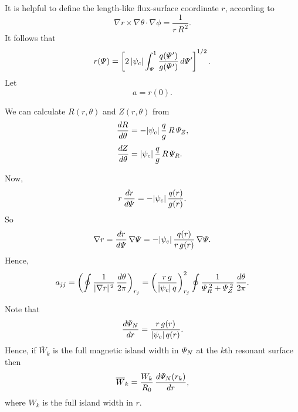 \documentclass[12pt]{article}
\begin{document}
It is helpful to define the length-like flux-surface coordinate $r$, according to
\begin{equation}
\nabla r\times \nabla\theta\cdot\nabla \phi = \frac{1}{r\,R^{\,2}}.
\end{equation}
It follows that
\begin{equation}
r({\mit\Psi}) = \left[2\,|\psi_c|\int_{{\mit\Psi}}^1\frac{q({\mit\Psi}')}
{g({\mit\Psi}')}\,d{\mit\Psi}'\right]^{1/2}.
\end{equation}
Let
\begin{equation}
a = r (0).
\end{equation}

We can calculate $R(r,\theta)$ and $Z(r,\theta)$ from 
\begin{align}
\frac{dR}{d\theta}&=-|\psi_c|\,\frac{q}{g}\,R\,{\mit\Psi}_Z,\\[0.5ex]
\frac{dZ}{d\theta} &= |\psi_c|\,\frac{q}{g}\,R\,{\mit\Psi}_R.
\end{align}

Now,
\begin{equation}
r\,\frac{dr}{d{\mit\Psi}} = -|\psi_c|\,\frac{q(r)}{g(r)}.
\end{equation}
So
\begin{equation}
\nabla r = \frac{dr}{d{\mit\Psi}}\,\nabla{\mit\Psi} = -|\psi_c|\,\frac{q(r)}{r\,g(r)}\,\nabla{\mit\Psi}.
\end{equation}
Hence,
\begin{equation}
a_{jj}  =\left(\oint \frac{1}{|\nabla r|^{\,2}}\,\frac{d\theta}{2\pi}\right)_{r_j} = \left(\frac{r\,g}{|\psi_c|\,q}\right)^2_{r_j}\oint
\frac{1}{{\mit\Psi}_R^{\,2}+{\mit\Psi}_Z^{\,2}}\,\frac{d\theta}{2\pi}.
\end{equation}

Note that
\begin{equation}
\frac{d{\mit\Psi}_N}{dr} =\frac{r\,g(r)}{|\psi_c|\,q(r)}.
\end{equation}
Hence, if $\overline{W}_k$ is the full magnetic island width in ${\mit\Psi}_N$ at the 
$k$th resonant surface then
\begin{equation}
\overline{W}_k = \frac{W_k}{R_0}\,\frac{d{\mit\Psi}_N(r_k)}{dr},
\end{equation}
where $W_k$ is the full island width in $r$. 
\end{document}
